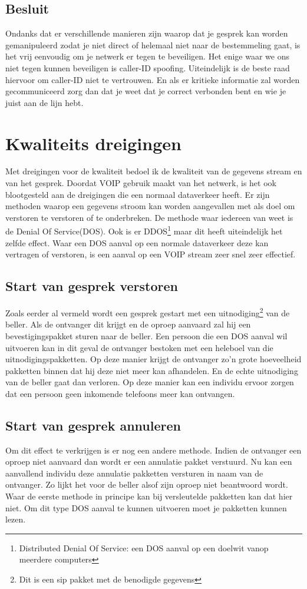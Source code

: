 \documentclass[pdftex,a4paper,12pt,twoside]{report}
\begin{document}
\subsection{Besluit}
Ondanks dat er verschillende manieren zijn waarop dat je gesprek kan worden gemanipuleerd zodat je niet direct of helemaal niet naar de bestemmeling gaat, is het vrij eenvoudig om je netwerk er tegen te beveiligen. Het enige waar we ons niet tegen kunnen beveiligen is caller-ID spoofing. Uiteindelijk is de beste raad hiervoor om caller-ID niet te vertrouwen. En als er kritieke informatie zal worden gecommuniceerd zorg dan dat je weet dat je correct verbonden bent en wie je juist aan de lijn hebt. 
\newpage

\section{Kwaliteits dreigingen}
Met dreigingen voor de kwaliteit bedoel ik de kwaliteit van de gegevens stream en van het gesprek. Doordat VOIP gebruik maakt van het netwerk, is het ook blootgesteld aan de dreigingen die een normaal dataverkeer heeft. Er zijn methoden waarop een gegevens stroom  kan worden aangevallen met als doel om verstoren te verstoren of te onderbreken. De methode waar iedereen van weet is de Denial Of Service(DOS). Ook is er DDOS\footnote{Distributed Denial Of Service: een DOS aanval op een doelwit vanop meerdere computers} maar dit heeft uiteindelijk het zelfde effect. Waar een DOS aanval op een normale dataverkeer deze kan vertragen of verstoren, is een aanval op een VOIP stream zeer snel zeer effectief. 

\subsection{Start van gesprek verstoren}
Zoals eerder al vermeld wordt een gesprek gestart met een uitnodiging\footnote{Dit is een sip pakket met de benodigde gegevens} van de beller. Als de ontvanger dit krijgt en de oproep aanvaard zal hij een bevestigingspakket sturen naar de beller. Een persoon die een DOS aanval wil uitvoeren kan in dit geval de ontvanger bestoken met een heleboel van die uitnodigingspakketten. Op deze manier krijgt de ontvanger zo'n grote hoeveelheid pakketten binnen dat hij deze niet meer kan afhandelen. En de echte uitnodiging van de beller gaat dan verloren. Op deze manier kan een individu ervoor zorgen dat een persoon geen inkomende telefoons meer kan ontvangen.

\subsection{Start van gesprek annuleren}
Om dit effect te verkrijgen is er nog een andere methode. Indien de ontvanger een oproep niet aanvaard dan wordt er een annulatie pakket verstuurd. Nu kan een aanvallend individu deze annulatie pakketten versturen in naam van de ontvanger. Zo lijkt het voor de beller alsof zijn oproep niet beantwoord wordt. Waar de eerste methode in principe kan bij versleutelde pakketten kan dat hier niet. Om dit type DOS aanval te kunnen uitvoeren moet je pakketten kunnen lezen.
\end{document}
